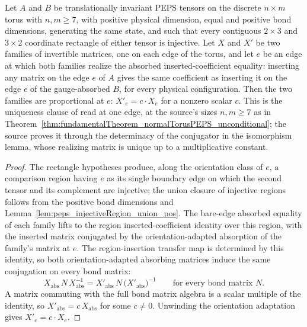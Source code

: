 \begin{theorem}%
    \label{thm:torusAbsorbedGauge_unique_scalar}
    \leanok
    Let $A$ and $B$ be translationally invariant PEPS tensors on the discrete
    $n\times m$ torus with $n,m\geq 7$, with positive physical dimension,
    equal and positive bond dimensions, generating the same state, and such
    that every contiguous
    $2\times 3$ and $3\times 2$ coordinate rectangle of either tensor is
    injective.  Let $X$ and $X'$ be two families of invertible matrices, one
    on each edge of the torus, and let $e$ be an edge at which both families
    realize the absorbed inserted-coefficient equality: inserting any matrix
    on the edge $e$ of $A$ gives the same coefficient as inserting it on the
    edge $e$ of the gauge-absorbed $B$, for every physical configuration.
    Then the two families are proportional at $e$: $X'_e = c\cdot X_e$ for a
    nonzero scalar $c$.
    This is the uniqueness clause of \cite[Theorem~3]{Molnar2018NormalPEPS}
    read at one edge, at the source's sizes $n,m\geq 7$ as in
    Theorem~\ref{thm:fundamentalTheorem_normalTorusPEPS_unconditional}; the
    source proves it through the determinacy of the conjugator in the
    isomorphism lemma, whose realizing matrix is unique up to a multiplicative
    constant.
    \begin{proof}
        \leanok
        The rectangle hypotheses produce, along the orientation class of $e$,
        a comparison region having $e$ as its single boundary edge on which
        the second tensor and its complement are injective; the union closure
        of injective regions follows from the positive bond dimensions and
        Lemma~\ref{lem:peps_injectiveRegion_union_pos}.  The bare-edge
        absorbed equality of each family lifts to the region
        inserted-coefficient identity over this region, with the inserted
        matrix conjugated by the orientation-adapted absorption of the
        family's matrix at $e$.  The region-insertion transfer map is
        determined by this identity, so both orientation-adapted absorbing
        matrices induce the same conjugation on every bond matrix:
        \[
            X_{\mathrm{abs}}\,N\,X_{\mathrm{abs}}^{-1}
            =
            X'_{\mathrm{abs}}\,N\,\bigl(X'_{\mathrm{abs}}\bigr)^{-1}
            \qquad\text{for every bond matrix }N.
        \]
        A matrix commuting with the full bond matrix algebra is a scalar
        multiple of the identity, so $X'_{\mathrm{abs}}=c\,X_{\mathrm{abs}}$
        for some $c\ne0$. Unwinding the orientation adaptation gives
        $X'_e=c\cdot X_e$.
    \end{proof}
\end{theorem}

